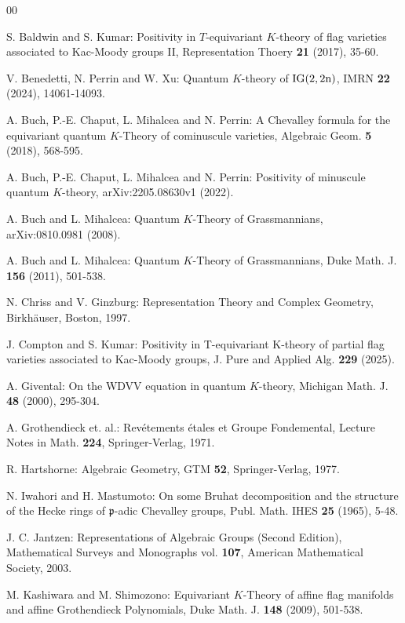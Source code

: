 \documentclass{article}
\def\IG{\rm{IG}}
\begin{document}
\begin{thebibliography}{00}

 S. Baldwin and S. Kumar: Positivity in $T$-equivariant $K$-theory of flag varieties associated to Kac-Moody groups II, Representation Thoery {\bf 21} (2017), 35-60. 

 V. Benedetti, N. Perrin and W. Xu: Quantum $K$-theory of $\IG(2, 2n)$, IMRN {\bf 22} (2024), 14061-14093.

 A. Buch, P.-E. Chaput, L. Mihalcea and N. Perrin: A Chevalley formula for the equivariant quantum $K$-Theory of cominuscule varieties, Algebraic Geom. {\bf 5} (2018), 568-595. 

 A. Buch, P.-E. Chaput, L. Mihalcea and N. Perrin: Positivity of minuscule quantum $K$-theory, arXiv:2205.08630v1 (2022). 

 A. Buch and L. Mihalcea: Quantum $K$-Theory of Grassmannians, arXiv:0810.0981 (2008).

 A. Buch and L. Mihalcea: Quantum $K$-Theory of Grassmannians, Duke Math. J. {\bf 156} (2011), 501-538.

 N. Chriss and V. Ginzburg: Representation Theory and Complex Geometry, Birkh\"auser, Boston, 1997. 

  J. Compton and S. Kumar: Positivity in T-equivariant K-theory of partial flag varieties associated to Kac-Moody groups, J. Pure and Applied Alg. {\bf 229} (2025).   

 A.  Givental: On the WDVV equation in quantum $K$-theory, Michigan Math. J. {\bf 48} (2000), 295-304. 

 A. Grothendieck et. al.: Rev\'etements \'etales et Groupe Fondemental, Lecture Notes in Math. {\bf 224}, Springer-Verlag, 1971. 

 R. Hartshorne: Algebraic Geometry, GTM {\bf 52}, Springer-Verlag, 1977. 

 N. Iwahori and H. Mastumoto: On some Bruhat decomposition and the structure of the Hecke rings of $\mathfrak{p}$-adic Chevalley groups, Publ. Math. IHES {\bf 25} (1965), 5-48.

 J. C. Jantzen: Representations of Algebraic Groups (Second Edition), Mathematical Surveys and Monographs vol. {\bf 107}, American Mathematical Society, 2003. 

 M. Kashiwara and M. Shimozono: Equivariant $K$-Theory of affine flag manifolds and affine Grothendieck Polynomials, Duke Math. J. {\bf 148} (2009), 501-538. 


\end{thebibliography}
\end{document}
